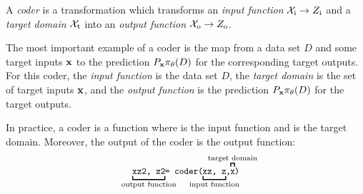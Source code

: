 \documentclass[12pt, twoside]{report}
\begin{document}
\begin{definition}[Coder]
    \label{def:coder}
    A \emph{coder} is a transformation which
    transforms an \emph{input function} $\X\ss{i} \to Z\ss{i}$
    and a \emph{target domain} $\X\ss{t}$
    into an \emph{output function} $\X\ss{o} \to Z\ss{o}$.
\end{definition}


The most important example of a coder is the map from a data set $D$ and some target inputs $\mathbf{x}$ to the prediction $P_{\mathbf{x}} \pi_\theta(D)$ for the corresponding target outputs.
For this coder,
the \emph{input function} is the data set $D$,
the \emph{target domain} is the set of target inputs $\mathbf{x}$, and
the \emph{output function} is the prediction $P_{\mathbf{x}} \pi_\theta(D)$ for the target outputs.

In practice, a coder is a function  where  is the input function and  is the target domain.
Moreover, the output of the coder  is the output function:
\begin{equation}
    \underbracket[1pt]{\code{xz2, z2\vphantom{)}}}_{\mathclap{\text{output function}}}
        \hspace{-2pt}
        \code{= coder(}
        \hspace{-2pt}
        \underbracket[1pt]{\code{xz, z\vphantom{)}}}_{\mathclap{\text{input function}}}
        \hspace{-2pt}
        \code{\vphantom{)},}
        \hspace{-2pt}
        \overbracket[1pt]{\code{\vphantom{(}x}}^{\mathclap{\text{target domain}}}
        \hspace{-2pt}
    \code{)}
\end{equation}
\end{document}
